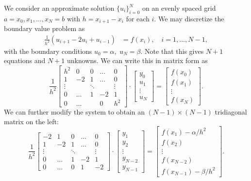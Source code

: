 We consider an approximate solution $\{u_i\}_{i=0}^N$ on an evenly spaced grid $a = x_0, x_1, \ldots, x_N = b$ with $h = x_{i+1}-x_i$ for each $i.$
We may discretize the boundary value problem as 
\begin{align*}
	\frac{1}{h^2} (u_{i+1}- 2u_i + u_{i-1})  &= f(x_i), \quad i = 1, \ldots, N-1,
\end{align*}
with the boundary conditions $u_0 = \alpha,$ $u_N = \beta.$ Note that this gives $N+1$ equations and $N+1$ unknowns. We can write this in matrix form as 
\[
\frac{1}{h^2} \begin{bmatrix}h^2 & 0 &0&\hdots &0 \\ 1 &-2 & 1 &\hdots &0\\ \vdots &  & \ddots & &\vdots \\
0 & \hdots & 1 & -2 & 1 \\ 0 & \hdots & & 0 & h^2
\end{bmatrix} \cdot \begin{bmatrix}y_0\\u_1\\ \vdots \\u_N\end{bmatrix} = \begin{bmatrix}f(x_0)\\f(x_1)\\ \vdots \\ f(x_N) \end{bmatrix}.
\]
We can further modify the system to obtain an $(N-1)\times (N-1)$ tridiagonal matrix on the left: 
\[
\frac{1}{h^2} \begin{bmatrix}-2 & 1 &0 & \hdots &0\\ 1 &-2 & 1 &\hdots &0\\ \vdots &  & \ddots & &\vdots \\ 0 & \hdots & 1 & -2 & 1 \\
0 & \hdots & 0 & 1 & -2 
\end{bmatrix} \cdot \begin{bmatrix}y_1\\y_2\\ \vdots \\y_{N-2}\\y_{N-1}\end{bmatrix} = \begin{bmatrix}f(x_1) -\alpha/h^2 \\f(x_2)\\ \vdots \\ f(x_{N-2})\\ f(x_{N-1})-\beta/h^2 \end{bmatrix}.
\]

